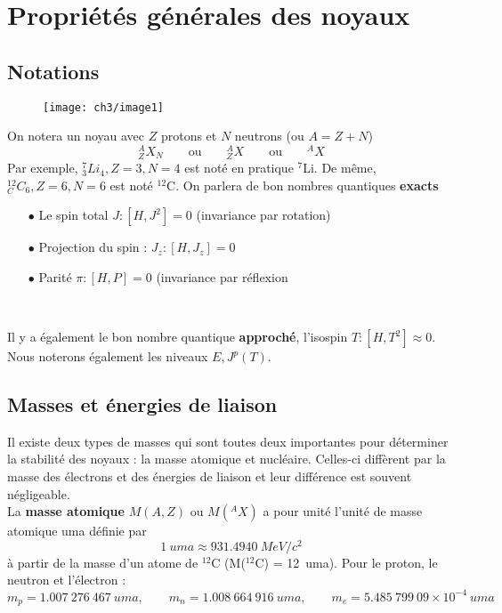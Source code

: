 \chapter{Propriétés générales des noyaux}

\section{Notations}
	\begin{wrapfigure}[28]{l}{4cm}
	\vspace{-5mm}
	\texttt{[image: ch3/image1]}
	\end{wrapfigure}
On notera un noyau avec $Z$ protons et $N$ neutrons (ou $A=Z+N$)
\begin{equation}
^A _ZX_N\qquad\text{ou}\qquad ^A _ZX\qquad\text{ou}\qquad ^A X
\end{equation}
Par exemple, $^7 _3Li_4, Z=3,N=4$ est noté en pratique $^7$Li. De même, 
$^{12} _C C_6,Z=6,N=6$ est noté $^{12}$C. On parlera de bon nombres quantiques \textbf{exacts} 
\begin{itemize}
\item[$\bullet$] Le spin total $J : [H,J^2]=0$ (invariance par rotation)
\item[$\bullet$] Projection du spin : $J_z : [H, J_z]  = 0$
\item[$\bullet$] Parité $\pi : [H,P] = 0$ (invariance par réflexion
\end{itemize}\

Il y a également le bon nombre quantique \textbf{approché}, l'isospin $T : [H,T^2]\approx0$. Nous noterons
également les niveaux $E, J^p(T)$.






\section{Masses et énergies de liaison}
Il existe deux types de masses qui sont toutes deux importantes pour déterminer la stabilité des noyaux : la masse
atomique et nucléaire. Celles-ci diffèrent par la masse des électrons et des énergies de liaison et leur différence
est souvent négligeable. \\

La \textbf{masse atomique} $M(A,Z)$ ou $M(^AX)$ a pour unité l'unité de masse atomique uma définie par 
\begin{equation}
1\ uma \approx 931.4940\ MeV/c^2
\end{equation}
à partir de la masse d'un atome de $^{12}$C (M($^{12}$C) = 12\ uma). Pour le proton, le neutron et l'électron :
\begin{equation}
m_p = 1.007\ 276\ 467\ uma,\qquad m_n = 1.008\ 664\ 916\ uma, \qquad m_e = 5.485\ 799\ 09 \times 10^{-4}\ uma
\end{equation}

